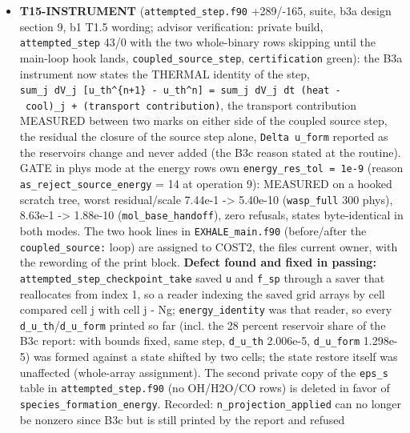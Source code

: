 \documentclass[english,a4paper]{my_memo}
\begin{document}
\begin{itemize}
  caloric\_eos, low\_mach\_dissipation, cross\_sec, UW\_conversions,
  h2\_photo\_channels, element\_census) removed: not built, but each defined
  the same module name as a live file and two scanners had to skip that
  directory (batch 2c) to stay green.
\item
  \textbf{T15-INSTRUMENT} (\texttt{attempted\_step.f90} +289/-165, suite, b3a design
  section 9, b1 T1.5 wording; advisor verification: private build,
  \texttt{attempted\_step} 43/0 with the two whole-binary rows skipping until the
  main-loop hook lands, \texttt{coupled\_source\_step}, \texttt{certification} green): the
  B3a instrument now states the THERMAL identity of the step, \texttt{sum\_j\ dV\_j\ {[}u\_th\^{}\{n+1\}\ -\ u\_th\^{}n{]}\ =\ sum\_j\ dV\_j\ dt\ (heat\ -\ cool)\_j\ +\ (transport\ contribution)}, the transport contribution MEASURED between two marks on
  either side of the coupled source step, the residual the closure of the
  source step alone, \texttt{Delta\ u\_form} reported as the reservoir\textquotesingle s change and
  never added (the B3c reason stated at the routine). GATE in phys mode at
  the energy row\textquotesingle s own \texttt{energy\_res\_tol\ =\ 1e-9} (reason \texttt{as\_reject\_source\_energy}
  = 14 at operation 9): MEASURED on a hooked scratch tree, worst
  \textbar residual/scale\textbar{} 7.44e-1 -\textgreater{} 5.40e-10 (\texttt{wasp\_full} 300 phys), 8.63e-1 -\textgreater{}
  1.88e-10 (\texttt{mol\_base\_handoff}), zero refusals, states byte-identical in
  both modes. The two hook lines in \texttt{EXHALE\_main.f90} (before/after the
  \texttt{coupled\_source:} loop) are assigned to COST2, the file\textquotesingle s current owner,
  with the rewording of the print block. \textbf{Defect found and fixed in
  passing:} \texttt{attempted\_step\_checkpoint\_take} saved \texttt{u} and \texttt{f\_sp} through
  a saver that reallocates from index 1, so a reader indexing the saved grid
  arrays by cell compared cell j with cell j - Ng; \texttt{energy\_identity} was that
  reader, so every \texttt{d\_u\_th}/\texttt{d\_u\_form} printed so far (incl. the 28 percent
  reservoir share of the B3c report: with bounds fixed, same step,
  \texttt{d\_u\_th} 2.006e-5, \texttt{d\_u\_form} 1.298e-5) was formed against a state shifted
  by two cells; the state restore itself was unaffected (whole-array
  assignment). The second private copy of the \texttt{eps\_s} table in
  \texttt{attempted\_step.f90} (no OH/H2O/CO rows) is deleted in favor of
  \texttt{species\_formation\_energy}. Recorded: \texttt{n\_projection\_applied} can no
  longer be nonzero since B3c but is still printed by the report and refused

\end{itemize}
\end{document}

